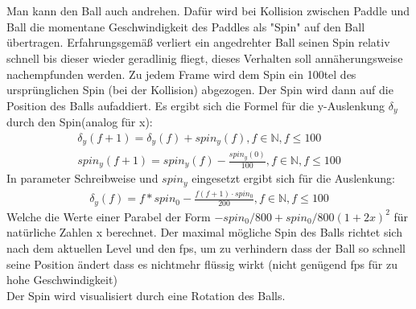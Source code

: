 \\\\
Man kann den Ball auch andrehen. Dafür wird bei Kollision zwischen Paddle und 
Ball die momentane Geschwindigkeit des Paddles als "Spin" auf den Ball 
übertragen. Erfahrungsgemäß verliert ein angedrehter Ball seinen Spin relativ 
schnell bis dieser wieder geradlinig fliegt, dieses Verhalten soll 
annäherungsweise nachempfunden werden.
Zu jedem Frame wird dem Spin ein 100tel des ursprünglichen Spin (bei der Kollision)
abgezogen. Der Spin wird dann auf die Position des Balls aufaddiert.
Es ergibt sich die Formel für die y-Auslenkung $\delta_y$ durch den Spin(analog für x):
\begin{align}
	\delta_y(f+1) = \delta_y(f) + spin_y(f), f \in \mathbb{N}, f \leq 100\\
	spin_y(f+1) = spin_y(f) - \frac{spin_y(0)}{100}, f \in \mathbb{N}, f \leq 100
\end{align}
In parameter Schreibweise und $spin_y$ eingesetzt ergibt sich für die Auslenkung:
\begin{align}
	\delta_y(f) = f*spin_0-\frac{f(f+1)\cdot spin_0}{200}, f \in \mathbb{N}, f \leq 100
\end{align}
Welche die Werte einer Parabel der Form $-spin_0/800+spin_0/800 (1+2 x)^2$ für natürliche Zahlen x berechnet.
Der maximal mögliche Spin des Balls richtet sich nach dem aktuellen Level und den fps, 
um zu verhindern dass der Ball so schnell seine Position ändert dass es nichtmehr flüssig wirkt (nicht genügend fps für zu hohe Geschwindigkeit)
\\
Der Spin wird visualisiert durch eine Rotation des Balls.
\\\\

